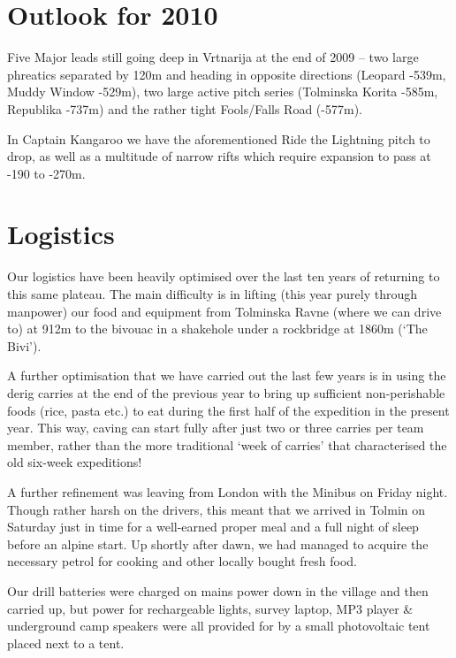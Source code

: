 
\section{Outlook for 2010}\label{outlook-for-2010}

Five Major leads still going deep in Vrtnarija at the end of 2009 -- two
large phreatics separated by 120m and heading in opposite directions
(Leopard -539m, Muddy Window -529m), two large active pitch series
(Tolminska Korita -585m, Republika -737m) and the rather tight
Fools/Falls Road (-577m).

In Captain Kangaroo we have the aforementioned Ride the Lightning pitch
to drop, as well as a multitude of narrow rifts which require expansion
to pass at -190 to -270m.

\section{Logistics}\label{logistics}

Our logistics have been heavily optimised over the last ten years of
returning to this same plateau. The main difficulty is in lifting (this
year purely through manpower) our food and equipment from Tolminska
Ravne (where we can drive to) at 912m to the bivouac in a shakehole
under a rockbridge at 1860m (`The Bivi').

A further optimisation that we have carried out the last few years is in
using the derig carries at the end of the previous year to bring up
sufficient non-perishable foods (rice, pasta etc.) to eat during the
first half of the expedition in the present year. This way, caving can
start fully after just two or three carries per team member, rather than
the more traditional `week of carries' that characterised the old
six-week expeditions!

A further refinement was leaving from London with the Minibus on Friday
night. Though rather harsh on the drivers, this meant that we arrived in
Tolmin on Saturday just in time for a well-earned proper meal and a full
night of sleep before an alpine start. Up shortly after dawn, we had
managed to acquire the necessary petrol for cooking and other locally
bought fresh food.

Our drill batteries were charged on mains power down in the village and
then carried up, but power for rechargeable lights, survey laptop, MP3
player \& underground camp speakers were all provided for by a small
photovoltaic tent placed next to a tent.

